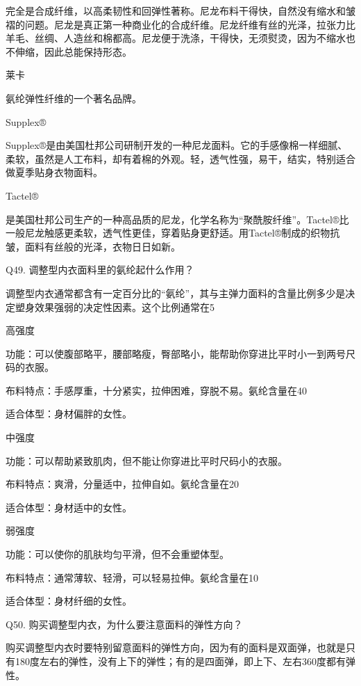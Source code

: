 \documentclass[12pt,UTF8]{ctexbook}
\begin{document}
完全是合成纤维，以高柔韧性和回弹性著称。尼龙布料干得快，自然没有缩水和皱褶的问题。尼龙是真正第一种商业化的合成纤维。尼龙纤维有丝的光泽，拉张力比羊毛、丝绸、人造丝和棉都高。尼龙便于洗涤，干得快，无须熨烫，因为不缩水也不伸缩，因此总能保持形态。

莱卡

氨纶弹性纤维的一个著名品牌。

Supplex®

Supplex®是由美国杜邦公司研制开发的一种尼龙面料。它的手感像棉一样细腻、柔软，虽然是人工布料，却有着棉的外观。轻，透气性强，易干，结实，特别适合做夏季贴身衣物面料。

Tactel®

是美国杜邦公司生产的一种高品质的尼龙，化学名称为“聚酰胺纤维”。Tactel®比一般尼龙触感更柔软，透气性更佳，穿着贴身更舒适。用Tactel®制成的织物抗皱，面料有丝般的光泽，衣物日日如新。





Q49. 调整型内衣面料里的氨纶起什么作用？


调整型内衣通常都含有一定百分比的“氨纶”，其与主弹力面料的含量比例多少是决定塑身效果强弱的决定性因素。这个比例通常在5%

高强度

功能：可以使腹部略平，腰部略瘦，臀部略小，能帮助你穿进比平时小一到两号尺码的衣服。

布料特点：手感厚重，十分紧实，拉伸困难，穿脱不易。氨纶含量在40%

适合体型：身材偏胖的女性。

中强度

功能：可以帮助紧致肌肉，但不能让你穿进比平时尺码小的衣服。

布料特点：爽滑，分量适中，拉伸自如。氨纶含量在20%

适合体型：身材适中的女性。

弱强度

功能：可以使你的肌肤均匀平滑，但不会重塑体型。

布料特点：通常薄软、轻滑，可以轻易拉伸。氨纶含量在10%

适合体型：身材纤细的女性。





Q50. 购买调整型内衣，为什么要注意面料的弹性方向？


购买调整型内衣时要特别留意面料的弹性方向，因为有的面料是双面弹，也就是只有180度左右的弹性，没有上下的弹性；有的是四面弹，即上下、左右360度都有弹性。
\end{document}
